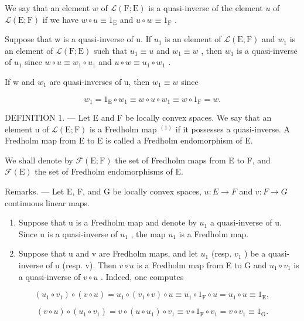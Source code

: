 We say that an element \(w\) of \(\mathcal{L}(\mathrm{F};\mathrm{E})\) is a quasi-inverse of the element \(u\) of \(\mathcal{L}(\mathrm{E};\mathrm{F})\) if we have \(w \circ u \equiv 1_{\mathrm{E}}\) and \(u \circ w \equiv 1_{\mathrm{F}}\) .

Suppose that w is a quasi-inverse of u. If \(u_{1}\) is an element of \(\mathcal{L}(\mathrm{E};\mathrm{F})\) and \(w_{1}\) is an element of \(\mathcal{L}(\mathrm{F};\mathrm{E})\) such that \(u_{1} \equiv u\) and \(w_{1} \equiv w\) , then \(w_{1}\) is a quasi-inverse of \(u_{1}\) since \(w \circ u \equiv w_{1} \circ u_{1}\) and \(u \circ w \equiv u_{1} \circ w_{1}\) .

If w and \(w_{1}\) are quasi-inverses of u, then \(w_{1} \equiv w\) since

\[
w _ {1} = 1 _ {\mathrm{E}} \circ w _ {1} \equiv w \circ u \circ w _ {1} \equiv w \circ 1 _ {\mathrm{F}} = w.
\]

DEFINITION 1. --- Let E and F be locally convex spaces. We say that an element u of \(\mathcal{L}(\mathrm{E};\mathrm{F})\) is a Fredholm map \(^{(1)}\) if it possesses a quasi-inverse. A Fredholm map from E to E is called a Fredholm endomorphism of E.

We shall denote by \(\mathcal{F}(\mathrm{E};\mathrm{F})\) the set of Fredholm maps from E to F, and \(\mathcal{F}(\mathrm{E})\) the set of Fredholm endomorphisms of E.

Remarks. --- Let E, F, and G be locally convex spaces, \(u: E \to F\) and \(v: F \to G\) continuous linear maps.

\begin{enumerate}
\def\labelenumi{\arabic{enumi})}
\item
  Suppose that u is a Fredholm map and denote by \(u_{1}\) a quasi-inverse of u. Since u is a quasi-inverse of \(u_{1}\) , the map \(u_{1}\) is a Fredholm map.
\item
  Suppose that u and v are Fredholm maps, and let \(u_{1}\) (resp. \(v_{1}\) ) be a quasi-inverse of u (resp. v). Then \(v \circ u\) is a Fredholm map from E to G and \(u_{1} \circ v_{1}\) is a quasi-inverse of \(v \circ u\) . Indeed, one computes
\end{enumerate}

\[
\left(u _ {1} \circ v _ {1}\right) \circ (v \circ u) = u _ {1} \circ \left(v _ {1} \circ v\right) \circ u \equiv u _ {1} \circ 1 _ {\mathrm{F}} \circ u = u _ {1} \circ u \equiv 1 _ {\mathrm{E}},
\]

\[
(v \circ u) \circ (u _ {1} \circ v _ {1}) = v \circ (u \circ u _ {1}) \circ v _ {1} \equiv v \circ 1 _ {\mathrm{F}} \circ v _ {1} = v \circ v _ {1} \equiv 1 _ {\mathrm{G}}.
\]

